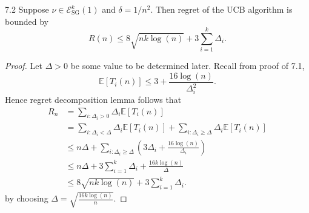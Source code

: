 \documentclass[10pt]{article}
\newenvironment{theorem*}[1]{%
  \IfBlankTF{#1}
    {\renewcommand{\themanualtheoreminner}{\unskip}}
    {\renewcommand\themanualtheoreminner{#1}}%
  \manualtheoreminner
}{\endmanualtheoreminner}
\theoremstyle{definition}
\begin{document}
\begin{theorem*}{7.2}
    Suppose $\nu \in \mathcal{E}_{\mathrm{SG}}^k(1)$ and $\delta=1/n^2$. Then regret of the UCB algorithm is bounded by
    \begin{equation*}
        R(n) \leq 8\sqrt{nk \log (n)} + 3 \sum_{i=1}^k \Delta_i.
    \end{equation*}
\end{theorem*}

\begin{proof}
    Let $\Delta > 0$ be some value to be determined later.
    Recall from proof of 7.1,
    \begin{equation*}
        \mathbb{E}[T_i (n)] \leq 3 + \frac{16 \log (n)}{\Delta_i^2}.
    \end{equation*}
    Hence regret decomposition lemma follows that
    \begin{align*}
        R_n &= \sum_{i: \Delta_i > 0} \Delta_i \mathbb{E}[T_i(n)] \\
        &= \sum_{i: \Delta_i < \Delta} \Delta_i \mathbb{E}[T_i(n)] + \sum_{i: \Delta_i \geq \Delta} \Delta_i \mathbb{E}[T_i(n)] \\
        &\leq n\Delta + \sum_{i: \Delta_i \geq \Delta} \left( 3\Delta_i + \frac{16 \log (n)}{\Delta_i} \right) \\
        &\leq n\Delta + 3 \sum_{i=1}^k \Delta_i + \frac{16 k \log (n)}{\Delta} \\
        &\leq 8\sqrt{nk \log (n)} + 3 \sum_{i=1}^k \Delta_i.
    \end{align*}
    by choosing $\Delta = \sqrt{\frac{16 k \log (n)}{n}}$.
\end{proof}
\end{document}
